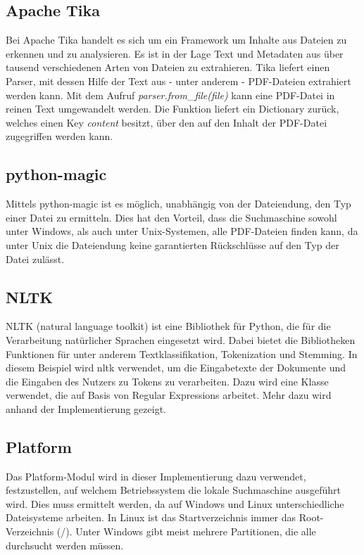 \subsection*{Apache Tika}\label{apache-tika}

Bei Apache Tika handelt es sich um ein Framework um Inhalte aus Dateien zu erkennen und zu analysieren. Es ist in der Lage Text und Metadaten aus über tausend verschiedenen Arten von Dateien zu extrahieren. Tika liefert einen Parser, mit dessen Hilfe der Text aus - unter anderem - PDF-Dateien extrahiert werden kann. Mit dem Aufruf \emph{parser.from}\_\emph{file(file)} kann eine PDF-Datei in reinen Text umgewandelt werden. Die Funktion liefert ein Dictionary zurück, welches einen Key \emph{content} besitzt, über den auf den Inhalt der PDF-Datei zugegriffen werden kann.

\subsection*{python-magic}\label{python-magic}

Mittels python-magic ist es möglich, unabhängig von der Dateiendung, den Typ einer Datei zu ermitteln. Dies hat den Vorteil, dass die Suchmaschine sowohl unter Windows, als auch unter Unix-Systemen, alle PDF-Dateien finden kann, da unter Unix die Dateiendung keine garantierten Rückschlüsse auf den Typ der Datei zulässt.

\subsection*{NLTK}\label{nltk}
NLTK (natural language toolkit) ist eine Bibliothek für Python, die für die Verarbeitung natürlicher Sprachen eingesetzt wird. Dabei bietet die Bibliotheken Funktionen für unter anderem Textklassifikation, Tokenization und Stemming.
In diesem Beispiel wird nltk verwendet, um die Eingabetexte der Dokumente und die Eingaben des Nutzers zu Tokens zu verarbeiten. Dazu wird eine Klasse verwendet, die auf Basis von Regular Expressions arbeitet. Mehr dazu wird anhand der Implementierung gezeigt. %

\subsection*{Platform}
Das Platform-Modul wird in dieser Implementierung dazu verwendet, festzustellen, auf welchem Betriebssystem die lokale Suchmaschine ausgeführt wird. Dies muss ermittelt werden, da auf Windows und Linux unterschiedliche Dateisysteme arbeiten. In Linux ist das Startverzeichnis immer das Root-Verzeichnis (\glqq /\grqq). Unter Windows gibt meist mehrere Partitionen, die alle durchsucht werden müssen.

